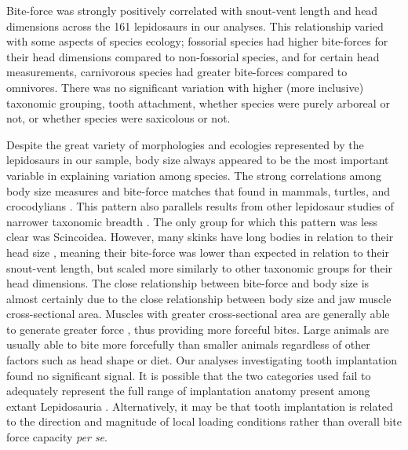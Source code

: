 \documentclass[a4paper, 12pt]{article}
\begin{document}
Bite-force was strongly positively correlated with snout-vent length and head dimensions across the 161 lepidosaurs in our analyses. 
This relationship varied with some aspects of species ecology; fossorial species had higher bite-forces for their head dimensions compared to non-fossorial species, and for certain head measurements, carnivorous species had greater bite-forces compared to omnivores. 
There was no significant variation with higher (more inclusive) taxonomic grouping, tooth attachment, whether species were purely arboreal or not, or whether species were saxicolous or not. 

Despite the great variety of morphologies and ecologies represented by the lepidosaurs in our sample, body size always appeared to be the most important variable in explaining variation among species. 
The strong correlations among body size measures and bite-force matches that found in mammals, turtles, and crocodylians \citep[e.g.][]{aguirre2002ecomorphological,becerra2013biting,marshall2012ontogenetic,erickson2014comparative}.
This pattern also parallels results from other lepidosaur studies of narrower taxonomic breadth \citep[e.g.][]{lailvaux2004performance,MEASEY2009217,jones2020reproductive,vanhooydonck2005does}.
The only group for which this pattern was less clear was Scincoidea. 
However, many skinks have long bodies in relation to their head size \citep[e.g.][]{wiens2006does}, meaning their bite-force was lower than expected in relation to their snout-vent length, but scaled more similarly to other taxonomic groups for their head dimensions. 
The close relationship between bite-force and body size is almost certainly due to the close relationship between body size and jaw muscle cross-sectional area. 
Muscles with greater cross-sectional area are generally able to generate greater force \citep{bamman2000evaluation,groning2013importance,sellers2017ontogeny}, thus providing more forceful bites. 
Large animals are usually able to bite more forcefully than smaller animals regardless of other factors such as head shape or diet. 
Our analyses investigating tooth implantation found no significant signal. 
It is possible that the two categories used fail to adequately represent the full range of implantation anatomy present among extant Lepidosauria \citep[e.g.][]{bertin2018current}.
Alternatively, it may be that tooth implantation is related to the direction and magnitude of local loading conditions rather than overall bite force capacity \textit{per se}.
 
\end{document}
